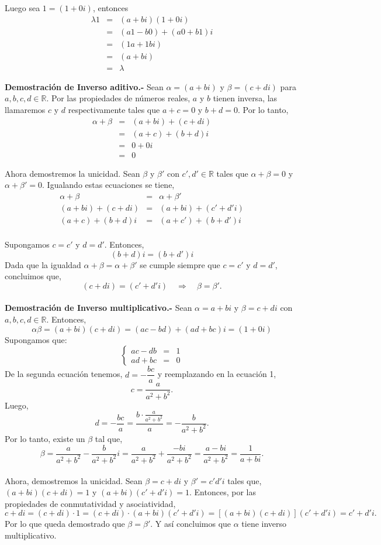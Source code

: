Luego sea $1=(1+0i)$, entonces
$$\begin{array}{rcl}
    \lambda 1 & = & (a+bi)(1+0i)\\
	      & = & (a1-b0)+(a0+b1)i\\
	      & = & (1a + 1bi)\\
	      & = & (a+bi)\\
	      & = & \lambda
\end{array}$$
\vspace{0.5cm}

\textbf{Demostración de Inverso aditivo.-}\; Sean $\alpha=(a+bi)$ y $\beta=(c+di)$ para $a,b,c,d\in \mathbb{R}$. Por las propiedades de números reales, $a$ y $b$ tienen inversa, las llamaremos $c$ y $d$ respectivamente tales que $a+c=0$ y $b+d=0$. Por lo tanto,
$$\begin{array}{rcl}
    \alpha+\beta &=& (a+bi)+(c+di)\\
		 &=& (a+c)+(b+d)i\\
		 &=& 0 + 0i\\
		 &=& 0
\end{array}$$

Ahora demostremos la unicidad. Sean $\beta$ y $\beta'$ con $c',d'\in \mathbb{R}$ tales que $\alpha+\beta=0$ y $\alpha+\beta'=0$. Igualando estas ecuaciones se tiene,
$$\begin{array}{rcl}
    \alpha+\beta&=&\alpha+\beta'\\
    (a+bi)+(c+di)&=&(a+bi)+(c'+d'i)\\
    (a+c)+(b+d)i&=&(a+c')+(b+d')i\\
\end{array}$$

Supongamos $c=c'$ y $d=d'$. Entonces,
$$(b+d)i=(b+d')i$$
Dada que la igualdad $\alpha+\beta=\alpha+\beta'$ se cumple siempre que $c=c'$ y $d=d'$, concluimos que,
$$(c+di)=(c'+d'i)\quad \Rightarrow \quad \beta=\beta'.$$\\

\textbf{Demostración de Inverso multiplicativo.-}\;  Sean $\alpha=a+bi$ y $\beta=c+di$ con $a,b,c,d\in \mathbb{R}$. Entonces,
$$\alpha\beta = (a+bi)(c+di) = (ac-bd)+(ad+bc)i=(1+0i)$$
Supongamos que:
$$\left\{\begin{array}{rcl}
    ac-db & = & 1\\
    ad+bc & = & 0
\end{array}\right.$$
De la segunda ecuación tenemos, $d=-\dfrac{bc}{a}$ y reemplazando en la ecuación 1, 
$$c=\dfrac{a}{a^2+b^2}.$$
Luego,
$$d=-\dfrac{bc}{a}=\dfrac{b\cdot \frac{a}{a^2+b^2}}{a}=-\dfrac{b}{a^2+b^2}.$$
Por lo tanto, existe un $\beta$ tal que,
$$\beta=\dfrac{a}{a^2+b^2}-\dfrac{b}{a^2+b^2}i=\dfrac{a}{a^2+b^2}+\dfrac{-bi}{a^2+b^2}=\dfrac{a-bi}{a^2+b^2}=\dfrac{1}{a+bi}.$$\\
Ahora, demostremos la unicidad. Sean $\beta=c+di$ y $\beta'=c'd'i$ tales que, $(a+bi)(c+di)=1$ y $(a+bi)(c'+d'i)=1$. Entonces, por las propiedades de conmutatividad y asociatividad,
$$c+di=(c+di)\cdot 1 = (c+di)\cdot(a+bi)(c'+d'i)=\left[(a+bi)(c+di)\right](c'+d'i)=c'+d'i.$$
Por lo que queda demostrado que $\beta=\beta'.$ Y así concluimos que $\alpha$ tiene inverso multiplicativo.\\\\

